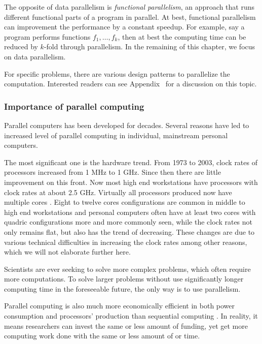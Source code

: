 The opposite of data parallelism is \emph{functional parallelism}, an approach that runs different functional parts of a program in parallel. At best, functional parallelism can improvement the performance by a constant speedup. For example, say a program performs functions $f_1,\dots,f_k$, then at best the computing time can be reduced by $k$-fold through parallelism. In the remaining of this chapter, we focus on data parallelism.

For specific problems, there are various design patterns to parallelize the computation. Interested readers can see Appendix~ for a discussion on this topic.

\subsubsection{Importance of parallel computing}
\label{ssub:Importance of parallel computing}

Parallel computers has been developed for decades. Several reasons have led to increased level of parallel computing in individual, mainstream personal computers.

The most significant one is the hardware trend. From 1973 to 2003, clock rates of processors increased from 1 MHz to 1 GHz. Since then there are little improvement on this front. Now most high end workstations have processors with clock rates at about 2.5 GHz. Virtually all processors produced now have multiple cores \cite{parallel}. Eight to twelve cores configurations are common in middle to high end workstations and personal computers often have at least two cores with quadric configurations more and more commonly seen, while the clock rates not only remains flat, but also has the trend of decreasing. These changes are due to various technical difficulties in increasing the clock rates among other reasons, which we will not elaborate further here.

Scientists are ever seeking to solve more complex problems, which often require more computations. To solve larger problems without use significantly longer computing time in the foreseeable future, the only way is to use parallelism.

Parallel computing is also much more economically efficient in both power consumption and processors' production than sequential computing \cite{parallel}. In reality, it means researchers can invest the same or less amount of funding, yet get more computing work done with the same or less amount of or time.

